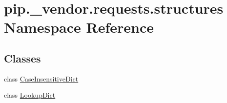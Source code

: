 \hypertarget{namespacepip_1_1__vendor_1_1requests_1_1structures}{}\section{pip.\+\_\+vendor.\+requests.\+structures Namespace Reference}
\label{namespacepip_1_1__vendor_1_1requests_1_1structures}
\subsection*{Classes}
\begin{DoxyCompactItemize}
\item 
class \hyperlink{classpip_1_1__vendor_1_1requests_1_1structures_1_1CaseInsensitiveDict}{Case\+Insensitive\+Dict}
\item 
class \hyperlink{classpip_1_1__vendor_1_1requests_1_1structures_1_1LookupDict}{Lookup\+Dict}
\end{DoxyCompactItemize}
